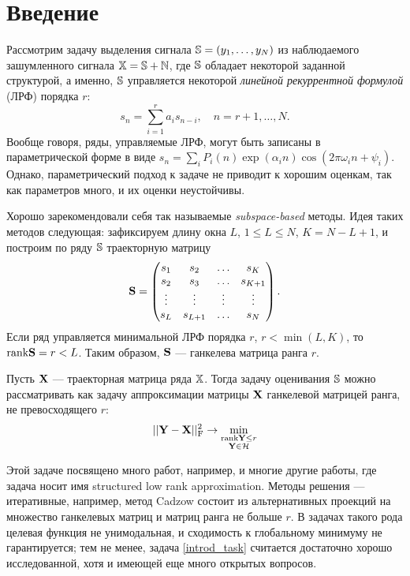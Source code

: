 \documentclass[12pt,a4paper,fleqn,leqno]{article}
\begin{document}
\section{Введение}
Рассмотрим задачу выделения сигнала $\mathbb{S} = (y_1, \ldots, y_N)$ из наблюдаемого зашумленного сигнала $\mathbb{X} = \mathbb{S} + \mathbb{N}$, где $\mathbb{S}$  обладает некоторой заданной структурой, а именно, $\mathbb{S}$ управляется некоторой \emph{линейной рекуррентной формулой} (ЛРФ) порядка $r$:
\begin{equation*}
s_n = \sum_{i = 1}^{r} a_i s_{n-i}, \quad n = r + 1, \ldots, N.
\end{equation*}
Вообще говоря, ряды, управляемые ЛРФ, могут быть записаны в параметрической форме в виде $s_n = \sum_i P_i(n) \exp(\alpha_i n) \cos(2 \pi \omega_i n + \psi_i)$. Однако, параметрический подход к задаче не приводит к хорошим оценкам, так как параметров много, и их оценки неустойчивы.

Хорошо зарекомендовали себя так называемые \emph{subspace-based} методы. Идея таких методов следующая: зафиксируем длину окна $L$, $1 \le L \le N$, $K = N - L + 1$, и построим по ряду $\mathbb{S}$ траекторную матрицу
\begin{equation*}
\mathbf{S} = \begin{pmatrix}
s_1 & s_2 & \ldots & s_K \\
s_2 & s_3 & \ldots & s_{K + 1} \\
\vdots & \vdots & \vdots & \vdots \\
s_L & s_{L + 1} & \ldots & s_N
\end{pmatrix}.
\end{equation*}
Если ряд управляется минимальной ЛРФ порядка $r$, $r < \min(L, K)$, то $\text{rank} \mathbf{S} = r < L$. Таким образом, $\mathbf{S}$ --- ганкелева матрица ранга $r$.

Пусть $\mathbf{X}$ --- траекторная матрица ряда $\mathbb{X}$. Тогда задачу оценивания $\mathbb{S}$ можно рассматривать как задачу аппроксимации матрицы $\mathbf{X}$ ганкелевой матрицей ранга, не превосходящего $r$:
\begin{equation}\label{introd_task}
||\mathbf{Y} - \mathbf{X}||^2_{\mathrm{F}} \to \min_{\substack{\text{rank} \mathbf{Y} \le r \\ \mathbf{Y} \in \mathcal{H}}}
\end{equation}

Этой задаче посвящено много работ, например, \cite{Cadzow1988, Markovsky2011, Usevich.Markovsky2014, Gillard2014} и многие другие работы, где задача носит имя
structured low rank approximation. Методы решения --- итеративные, например, метод Cadzow состоит из альтернативных проекций на множество ганкелевых матриц и матриц ранга не больше $r$. В задачах такого рода целевая функция не унимодальная, и сходимость к глобальному минимуму не гарантируется; тем не менее, задача \eqref{introd_task} считается достаточно хорошо исследованной, хотя и имеющей еще много открытых вопросов.
\end{document}
